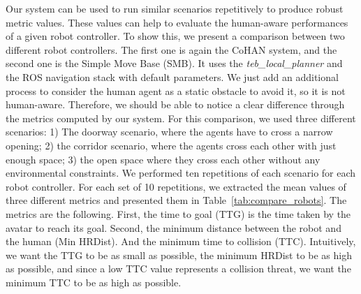 Our system can be used to run similar scenarios repetitively to produce robust metric values. These values can help to evaluate the human-aware performances of a given robot controller. To show this, we present a comparison between two different robot controllers. The first one is again the CoHAN system, and the second one is the Simple Move Base (SMB). It uses the \textit{teb\_local\_planner} and the ROS navigation stack with default parameters. We just add an additional process to consider the human agent as a static obstacle to avoid it, so it is not human-aware. Therefore, we should be able to notice a clear difference through the metrics computed by our system. For this comparison, we used three different scenarios: 1) The doorway scenario, where the agents have to cross a narrow opening; 2) the corridor scenario, where the agents cross each other with just enough space; 3) the open space where they cross each other without any environmental constraints. We performed ten repetitions of each scenario for each robot controller. For each set of 10 repetitions, we extracted the mean values of three different metrics and presented them in Table~\ref{tab:compare_robots}. The metrics are the following. First, the time to goal (TTG) is the time taken by the avatar to reach its goal. Second, the minimum distance between the robot and the human (Min HRDist). And the minimum time to collision (TTC). Intuitively, we want the TTG to be as small as possible, the minimum HRDist to be as high as possible, and since a low TTC value represents a collision threat, we want the minimum TTC to be as high as possible. 


